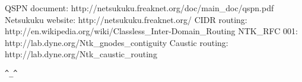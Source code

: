 \documentclass[a4paper]{article}
\newcommand{\href}[2]{ #1 }
\begin{document}
\begin{thebibliography}{99}
	 QSPN document:
		\href{http://netsukuku.freaknet.org/doc/main\_doc/qspn.pdf}{qspn.pdf}
	 Netsukuku website:
		\href{http://netsukuku.freaknet.org/}{http://netsukuku.freaknet.org/}
	 CIDR routing:
		\href{http://en.wikipedia.org/wiki/Classless\_Inter-Domain\_Routing}{Classless\_Inter-Domain\_Routing in Wikipedia}
	 NTK\_RFC 001:
		\href{http://lab.dyne.org/Ntk\_gnodes\_contiguity}{Gnode contiguity}
	 Caustic routing:
		\href{http://lab.dyne.org/Ntk\_caustic\_routing}{RFC 0013}
\end{thebibliography}
\newpage

\begin{center}
\verb|^_^|
\end{center}
\end{document}
